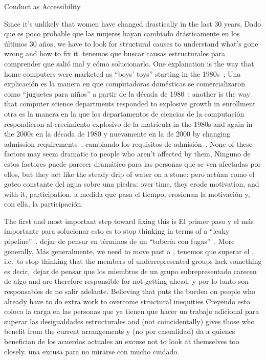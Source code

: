 \begin{aside}{Conduct as Accessibility}

Since it's unlikely that women have changed drastically in the last 30 years,
Dado que es poco probable que las mujeres hayan cambiado drásticamente en los últimos 30 años,
we have to look for structural causes to understand what's gone wrong and how to fix it.
tenemos que buscar causas estructurales para comprender que salió mal y cómo solucionarlo.
One explanation is the way that home computers were marketed as ``boys' toys'' starting in the 1980s~\cite{Marg2003};
Una explicación es la manera en que computadoras domésticas se comercializaron como ``juguetes para niños'' a partir de la década de 1980~\cite{Marg2003};
another is the way that computer science departments responded to explosive growth in enrollment
otra es la manera en la que los departamentos de ciencias de la computación respondieron al crecimiento explosivo de la matrícula
in the 1980s and again in the 2000s
en la década de 1980 y nuevamente en la de 2000
by changing admission requirements~\cite{Robe2017}.
cambiando los requisitos de admisión~\cite{Robe2017}.
None of these factors may seem dramatic to people who aren't affected by them,
Ninguno de estos factores puede parecer dramático para las personas que se ven afectadas por ellos,
but they act like the steady drip of water on a stone:
pero actúan como el goteo constante del agua sobre una piedra:
over time, they erode motivation, and with it, participation.
a medida que pasa el tiempo, erosionan la motivación y, con ella, la participación.

The first and most important step toward fixing this is
El primer paso y el más importante para solucionar esto es
to stop thinking in terms of a ``leaky pipeline''~\cite{Mill2015}.
dejar de pensar en términos de un ``tubería con fugas''~\cite{Mill2015}.
More generally,
Más generalmente,
we need to move past a ,
tenemos que superar el ,
i.e.\ to stop thinking that the members of underrepresented groups lack something
es decir,\ dejar de pensar que los miembros de un grupo subrepresentado carecen de algo
and are therefore responsible for not getting ahead.
y por lo tanto son responsables de no salir adelante.
Believing that puts the burden on people who already have to do extra work to overcome structural inequities
Creyendo esto coloca la carga en las personas que ya tienen que hacer un trabajo adicional para superar las desigualdades estructurales
and (not coincidentally) gives those who benefit from the current arrangements
y (no por casualidad) da a quienes benefician de los acuerdos actuales
an excuse not to look at themselves too closely.
una excusa para no mirarse con mucho cuidado.


\end{aside}
